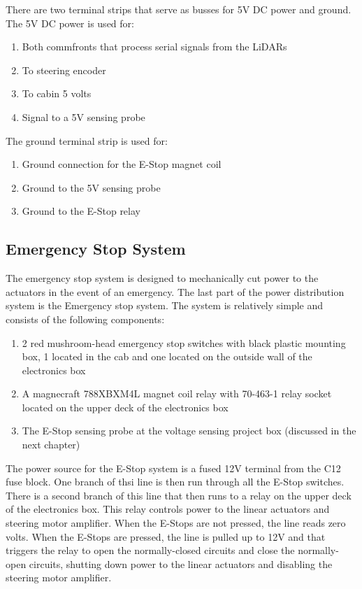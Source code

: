 There are two terminal strips that serve as busses for 5V DC power and ground.  The 5V DC power is used for:

\begin{enumerate}
\item Both commfronts that process serial signals from the LiDARs
\item To steering encoder
\item To cabin 5 volts
\item Signal to a 5V sensing probe
\end{enumerate}

\noindent The ground terminal strip is used for:

\begin{enumerate}
\item Ground connection for the E-Stop magnet coil
\item Ground to the 5V sensing probe
\item Ground to the E-Stop relay
\end{enumerate}

\newpage

\subsection{Emergency Stop System}

The emergency stop system is designed to mechanically cut power to the actuators in the event of an emergency. The last part of the power distribution system is the Emergency stop system. The system is relatively simple and consists of the following components:\\

\begin{enumerate}
\item 2 red mushroom-head emergency stop switches with black plastic mounting box, 1 located in the cab and one located on the outside wall of the electronics box
\item A magnecraft 788XBXM4L magnet coil relay with 70-463-1 relay socket located on the upper deck of the electronics box
\item The E-Stop sensing probe at the voltage sensing project box (discussed in the next chapter)
\end{enumerate}

\noindent The power source for the E-Stop system is a fused 12V terminal from the C12 fuse block. One branch of thsi line is then run through all the E-Stop switches. There is a second branch of this line that then runs to a relay on the upper deck of the electronics box. This relay controls power to the linear actuators and steering motor amplifier. When the E-Stops are not pressed, the line reads zero volts. When the E-Stops are pressed, the line is pulled up to 12V and that triggers the relay to open the normally-closed circuits and close the normally-open circuits, shutting down power to the linear actuators and disabling the steering motor amplifier.


